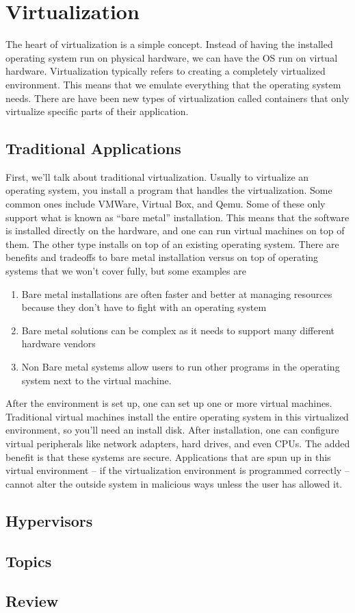 \chapter{Virtualization}

The heart of virtualization is a simple concept.
Instead of having the installed operating system run on physical hardware, we can have the OS run on virtual hardware.
Virtualization typically refers to creating a completely virtualized environment.
This means that we emulate everything that the operating system needs.
There are have been new types of virtualization called containers that only virtualize specific parts of their application.

\section{Traditional Applications}

First, we'll talk about traditional virtualization.
Usually to virtualize an operating system, you install a program that handles the virtualization.
Some common ones include VMWare, Virtual Box, and Qemu.
Some of these only support what is known as ``bare metal'' installation.
This means that the software is installed directly on the hardware, and one can run virtual machines on top of them.
The other type installs on top of an existing operating system.
There are benefits and tradeoffs to bare metal installation versus on top of operating systems that we won't cover fully, but some examples are

\begin{enumerate}
\item Bare metal installations are often faster and better at managing resources because they don't have to fight with an operating system
\item Bare metal solutions can be complex as it needs to support many different hardware vendors
\item Non Bare metal systems allow users to run other programs in the operating system next to the virtual machine.
\end{enumerate}

After the environment is set up, one can set up one or more virtual machines.
Traditional virtual machines install the entire operating system in this virtualized environment, so you'll need an install disk.
After installation, one can configure virtual peripherals like network adapters, hard drives, and even CPUs.
The added benefit is that these systems are secure.
Applications that are spun up in this virtual environment -- if the virtualization environment is programmed correctly -- cannot alter the outside system in malicious ways unless the user has allowed it.

\section{Hypervisors}



\section{Topics}

\section{Review}



